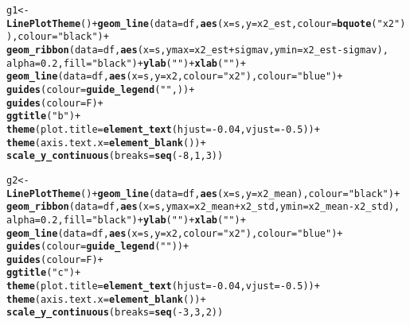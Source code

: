 \documentclass{article}\usepackage[]{graphicx}\usepackage[]{color}
\makeatletter
\newcommand{\hlnum}[1]{\textcolor[rgb]{0.686,0.059,0.569}{#1}}%
\newcommand{\hlstr}[1]{\textcolor[rgb]{0.192,0.494,0.8}{#1}}%
\newcommand{\hlopt}[1]{\textcolor[rgb]{0,0,0}{#1}}%
\newcommand{\hlstd}[1]{\textcolor[rgb]{0.345,0.345,0.345}{#1}}%
\newcommand{\hlkwb}[1]{\textcolor[rgb]{0.69,0.353,0.396}{#1}}%
\newcommand{\hlkwc}[1]{\textcolor[rgb]{0.333,0.667,0.333}{#1}}%
\newcommand{\hlkwd}[1]{\textcolor[rgb]{0.737,0.353,0.396}{\textbf{#1}}}%
\newenvironment{kframe}{%
 \def\at@end@of@kframe{}%
 \ifinner\ifhmode%
  \def\at@end@of@kframe{\end{minipage}}%
  \begin{minipage}{\columnwidth}%
 \fi\fi%
 \def\FrameCommand##1{\hskip\@totalleftmargin \hskip-\fboxsep
 \colorbox{shadecolor}{##1}\hskip-\fboxsep
     \hskip-\linewidth \hskip-\@totalleftmargin \hskip\columnwidth}%
 \MakeFramed {\advance\hsize-\width
   \@totalleftmargin\z@ \linewidth\hsize
   \@setminipage}}%
 {\par\unskip\endMakeFramed%
 \at@end@of@kframe}
\newenvironment{knitrout}{}{} %
\makeatother
\begin{document}
\begin{knitrout}
\begin{kframe}
\begin{alltt}
\hlstd{g1} \hlkwb{<-} \hlkwd{LinePlotTheme}\hlstd{()} \hlopt{+} \hlkwd{geom_line}\hlstd{(}\hlkwc{data}\hlstd{=df,}\hlkwd{aes}\hlstd{(}\hlkwc{x}\hlstd{=s,}\hlkwc{y}\hlstd{=x2_est,}\hlkwc{colour}\hlstd{=}\hlkwd{bquote}\hlstd{(}\hlstr{"x2"}\hlstd{)),}\hlkwc{colour}\hlstd{=}\hlstr{"black"}\hlstd{)} \hlopt{+}
   \hlkwd{geom_ribbon}\hlstd{(}\hlkwc{data}\hlstd{=df,}\hlkwd{aes}\hlstd{(}\hlkwc{x}\hlstd{=s,} \hlkwc{ymax} \hlstd{= x2_est} \hlopt{+} \hlstd{sigmav,} \hlkwc{ymin} \hlstd{= x2_est}\hlopt{-}\hlstd{sigmav),}
               \hlkwc{alpha}\hlstd{=}\hlnum{0.2}\hlstd{,}\hlkwc{fill}\hlstd{=}\hlstr{"black"}\hlstd{)} \hlopt{+} \hlkwd{ylab}\hlstd{(}\hlstr{""}\hlstd{)} \hlopt{+}\hlkwd{xlab}\hlstd{(}\hlstr{""}\hlstd{)} \hlopt{+}
    \hlkwd{geom_line}\hlstd{(}\hlkwc{data}\hlstd{=df,}\hlkwd{aes}\hlstd{(}\hlkwc{x}\hlstd{=s,}\hlkwc{y}\hlstd{=x2,}\hlkwc{colour}\hlstd{=}\hlstr{"x2"}\hlstd{),}\hlkwc{colour}\hlstd{=}\hlstr{"blue"}\hlstd{)} \hlopt{+}
  \hlkwd{guides}\hlstd{(}\hlkwc{colour}\hlstd{=}\hlkwd{guide_legend}\hlstd{(}\hlstr{""}\hlstd{,))}  \hlopt{+}
  \hlkwd{guides}\hlstd{(}\hlkwc{colour}\hlstd{=F)} \hlopt{+}
  \hlkwd{ggtitle}\hlstd{(}\hlstr{"b"}\hlstd{)} \hlopt{+}
  \hlkwd{theme}\hlstd{(}\hlkwc{plot.title} \hlstd{=} \hlkwd{element_text}\hlstd{(}\hlkwc{hjust} \hlstd{=} \hlopt{-}\hlnum{0.04}\hlstd{,}\hlkwc{vjust}\hlstd{=}\hlopt{-}\hlnum{0.5}\hlstd{))} \hlopt{+}
  \hlkwd{theme}\hlstd{(}\hlkwc{axis.text.x}\hlstd{=}\hlkwd{element_blank}\hlstd{())} \hlopt{+}
  \hlkwd{scale_y_continuous}\hlstd{(}\hlkwc{breaks}\hlstd{=}\hlkwd{seq}\hlstd{(}\hlopt{-}\hlnum{8}\hlstd{,}\hlnum{1}\hlstd{,}\hlnum{3}\hlstd{))}

\hlstd{g2} \hlkwb{<-} \hlkwd{LinePlotTheme}\hlstd{()} \hlopt{+} \hlkwd{geom_line}\hlstd{(}\hlkwc{data}\hlstd{=df,}\hlkwd{aes}\hlstd{(}\hlkwc{x}\hlstd{=s,}\hlkwc{y}\hlstd{=x2_mean),}\hlkwc{colour}\hlstd{=}\hlstr{"black"}\hlstd{)} \hlopt{+}
  \hlkwd{geom_ribbon}\hlstd{(}\hlkwc{data}\hlstd{=df,}\hlkwd{aes}\hlstd{(}\hlkwc{x}\hlstd{=s,} \hlkwc{ymax} \hlstd{= x2_mean} \hlopt{+} \hlstd{x2_std,} \hlkwc{ymin} \hlstd{= x2_mean}\hlopt{-}\hlstd{x2_std),}
              \hlkwc{alpha}\hlstd{=}\hlnum{0.2}\hlstd{,}\hlkwc{fill}\hlstd{=}\hlstr{"black"}\hlstd{)} \hlopt{+} \hlkwd{ylab}\hlstd{(}\hlstr{""}\hlstd{)} \hlopt{+}\hlkwd{xlab}\hlstd{(}\hlstr{""}\hlstd{)} \hlopt{+}
  \hlkwd{geom_line}\hlstd{(}\hlkwc{data}\hlstd{=df,}\hlkwd{aes}\hlstd{(}\hlkwc{x}\hlstd{=s,}\hlkwc{y}\hlstd{=x2,}\hlkwc{colour}\hlstd{=}\hlstr{"x2"}\hlstd{),}\hlkwc{colour}\hlstd{=}\hlstr{"blue"}\hlstd{)} \hlopt{+}
  \hlkwd{guides}\hlstd{(}\hlkwc{colour}\hlstd{=}\hlkwd{guide_legend}\hlstd{(}\hlstr{""}\hlstd{))} \hlopt{+}
  \hlkwd{guides}\hlstd{(}\hlkwc{colour}\hlstd{=F)} \hlopt{+}
  \hlkwd{ggtitle}\hlstd{(}\hlstr{"c"}\hlstd{)} \hlopt{+}
  \hlkwd{theme}\hlstd{(}\hlkwc{plot.title} \hlstd{=} \hlkwd{element_text}\hlstd{(}\hlkwc{hjust} \hlstd{=} \hlopt{-}\hlnum{0.04}\hlstd{,}\hlkwc{vjust}\hlstd{=}\hlopt{-}\hlnum{0.5}\hlstd{))} \hlopt{+}
  \hlkwd{theme}\hlstd{(}\hlkwc{axis.text.x}\hlstd{=}\hlkwd{element_blank}\hlstd{())} \hlopt{+}
  \hlkwd{scale_y_continuous}\hlstd{(}\hlkwc{breaks}\hlstd{=}\hlkwd{seq}\hlstd{(}\hlopt{-}\hlnum{3}\hlstd{,}\hlnum{3}\hlstd{,}\hlnum{2}\hlstd{))}


\end{alltt}
\end{kframe}
\end{knitrout}
\end{document}
